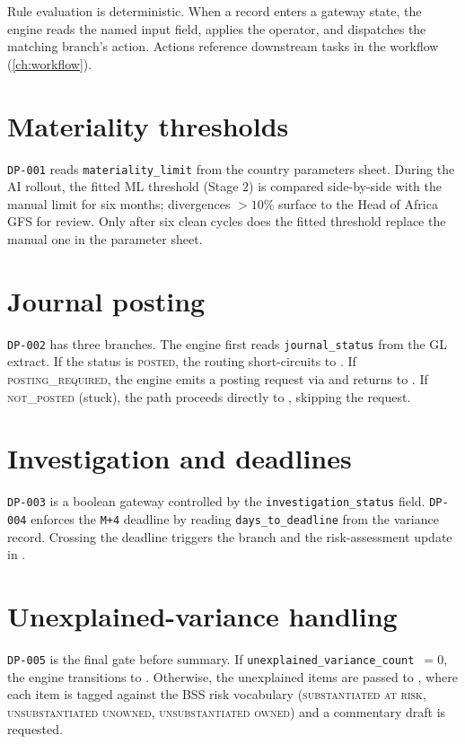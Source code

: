 Rule evaluation is deterministic. When a record enters a gateway
state, the engine reads the named input field, applies the operator,
and dispatches the matching branch's action. Actions reference
downstream tasks in the workflow (\cref{ch:workflow}).

\section{Materiality thresholds}

\texttt{DP-001} reads \texttt{materiality\_limit} from the country
parameters sheet. During the AI rollout, the fitted ML threshold
(Stage 2) is compared side-by-side with the manual limit for six
months; divergences $> 10\%$ surface to the Head of Africa GFS for
review. Only after six clean cycles does the fitted threshold
replace the manual one in the parameter sheet.

\section{Journal posting}

\texttt{DP-002} has three branches. The engine first reads
\texttt{journal\_status} from the GL extract. If the status is
\textsc{posted}, the routing short-circuits to
. If \textsc{posting\_required}, the
engine emits a posting request via
 and returns to
. If \textsc{not\_posted}
(stuck), the path proceeds directly to
, skipping the request.

\section{Investigation and deadlines}

\texttt{DP-003} is a boolean gateway controlled by the
\texttt{investigation\_status} field. \texttt{DP-004} enforces the
\texttt{M+4} deadline by reading \texttt{days\_to\_deadline} from the
variance record. Crossing the deadline triggers the
 branch and the risk-assessment update in
.

\section{Unexplained-variance handling}

\texttt{DP-005} is the final gate before summary. If
\texttt{unexplained\_variance\_count $= 0$}, the engine transitions to
. Otherwise, the unexplained items are
passed to , where each item is
tagged against the BSS risk vocabulary (\textsc{substantiated at risk},
\textsc{unsubstantiated unowned}, \textsc{unsubstantiated owned}) and
a commentary draft is requested.


